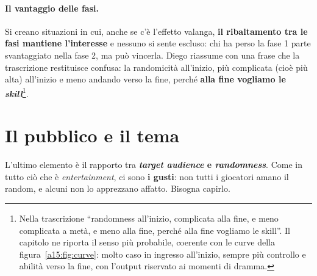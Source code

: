 \paragraph{Il vantaggio delle fasi.} Si creano situazioni in cui, anche se c'è l'effetto
valanga, \textbf{il ribaltamento tra le fasi mantiene l'interesse} e nessuno si sente escluso:
chi ha perso la fase 1 parte svantaggiato nella fase 2, ma può vincerla. Diego riassume con una
frase che la trascrizione restituisce confusa: la randomicità all'inizio, più complicata (cioè
più alta) all'inizio e meno andando verso la fine, perché \textbf{alla fine vogliamo le
\emph{skill}}\footnote{Nella trascrizione ``randomness all'inizio, complicata alla fine, e meno
complicata a metà, e meno alla fine, perché alla fine vogliamo le skill''. Il capitolo ne
riporta il senso più probabile, coerente con le curve della figura~\ref{a15:fig:curve}: molto
caso in ingresso all'inizio, sempre più controllo e abilità verso la fine, con l'output
riservato ai momenti di dramma.}.

\section{Il pubblico e il tema}
\label{a15:sec:pubblico}

L'ultimo elemento è il rapporto tra \textbf{\emph{target audience} e \emph{randomness}}. Come
in tutto ciò che è \emph{entertainment}, ci sono \textbf{i gusti}: non tutti i giocatori amano
il random, e alcuni non lo apprezzano affatto. Bisogna capirlo.

